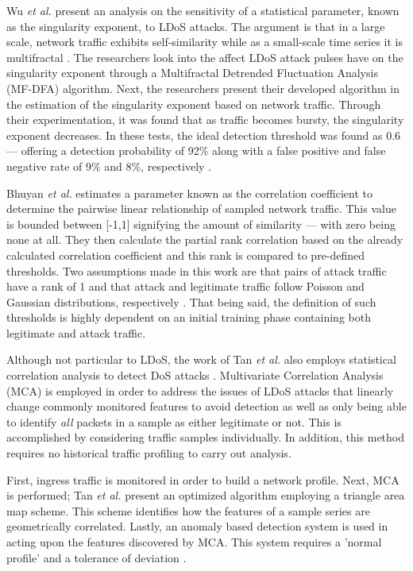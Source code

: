\documentclass[conference]{IEEEtran}
\begin{document}
Wu \textit{et al.} present an analysis on the sensitivity of a statistical parameter, known as the singularity exponent, to LDoS attacks. The argument is that in a large scale, network traffic exhibits self-similarity while as a small-scale time series it is multifractal \cite{Wu:LDoSMultifractal}. The researchers look into the affect LDoS attack pulses have on the singularity exponent through a Multifractal Detrended Fluctuation Analysis (MF-DFA) algorithm. Next, the researchers present their developed algorithm in the estimation of the singularity exponent based on network traffic. Through their experimentation, it was found that as traffic becomes bursty, the singularity exponent decreases. In these tests, the ideal detection threshold was found as 0.6 --- offering a detection probability of 92\% along with a false positive and false negative rate of 9\% and 8\%, respectively \cite{Wu:LDoSMultifractal}.

Bhuyan \textit{et al.} estimates a parameter known as the correlation coefficient to determine the pairwise linear relationship of sampled network traffic. This value is bounded between [-1,1] signifying the amount of similarity --- with zero being none at all. They then calculate the partial rank correlation based on the already calculated correlation coefficient and this rank is compared to pre-defined thresholds. Two assumptions made in this work are that pairs of attack traffic have a rank of 1 and that attack and legitimate traffic follow Poisson and Gaussian distributions, respectively \cite{Bhuyan:partialRank}. That being said, the definition of such thresholds is highly dependent on an initial training phase containing both legitimate and attack traffic.

Although not particular to LDoS, the work of Tan \textit{et al.} also employs statistical correlation analysis to detect DoS attacks \cite{Tan:MCA}. Multivariate Correlation Analysis (MCA) is employed in order to address the issues of LDoS attacks that linearly change commonly monitored features to avoid detection as well as only being able to identify \textit{all} packets in a sample as either legitimate or not. This is accomplished by considering traffic samples individually. In addition, this method requires no historical traffic profiling to carry out analysis.

First, ingress traffic is monitored in order to build a network profile. Next, MCA is performed; Tan \textit{et al.} present an optimized algorithm employing a triangle area map scheme. This scheme identifies how the features of a sample series are geometrically correlated. Lastly, an anomaly based detection system is used in acting upon the features discovered by MCA. This system requires a 'normal profile' and a tolerance of deviation \cite{Tan:MCA}.
\end{document}
